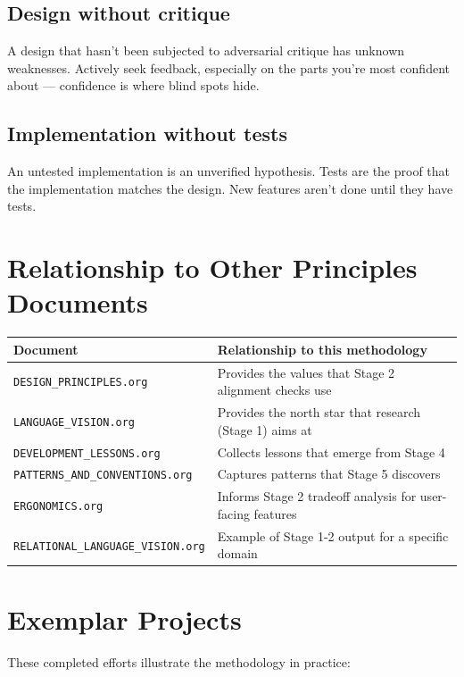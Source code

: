\documentclass[11pt]{article}
\begin{document}
\subsection{Design without critique}
\label{sec:org26e7da9}

A design that hasn't been subjected to adversarial critique has
unknown weaknesses. Actively seek feedback, especially on the parts
you're most confident about --- confidence is where blind spots hide.
\subsection{Implementation without tests}
\label{sec:org45dab49}

An untested implementation is an unverified hypothesis. Tests are the
proof that the implementation matches the design. New features aren't
done until they have tests.
\section{Relationship to Other Principles Documents}
\label{sec:org0898d83}

\begin{center}
\begin{tabular}{ll}
Document & Relationship to this methodology\\
\hline
\texttt{DESIGN\_PRINCIPLES.org} & Provides the values that Stage 2 alignment checks use\\
\texttt{LANGUAGE\_VISION.org} & Provides the north star that research (Stage 1) aims at\\
\texttt{DEVELOPMENT\_LESSONS.org} & Collects lessons that emerge from Stage 4\\
\texttt{PATTERNS\_AND\_CONVENTIONS.org} & Captures patterns that Stage 5 discovers\\
\texttt{ERGONOMICS.org} & Informs Stage 2 tradeoff analysis for user-facing features\\
\texttt{RELATIONAL\_LANGUAGE\_VISION.org} & Example of Stage 1-2 output for a specific domain\\
\end{tabular}
\end{center}
\section{Exemplar Projects}
\label{sec:orgd078957}

These completed efforts illustrate the methodology in practice:
\end{document}

